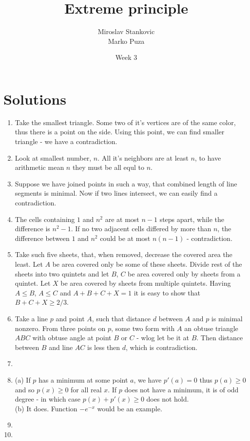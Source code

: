 \documentclass[12pt]{article}
\title{\textbf{Extreme principle}}
\date{Week 3}
\author{Miroslav Stankovic\\ Marko Puza}
\begin{document}
\maketitle

\section{Solutions}

\begin{enumerate}
	\item{Take the smallest triangle. Some two of it's vertices are of the same color, thus there is a point on the side. Using this point, we can find smaller triangle - we have a contradiction.
	}
	
	\item{Look at smallest number, $n$. All it's neighbors are at least $n$, to have arithmetic mean $n$ they must be all equl to $n$.}
	
	\item{Suppose we have joined points in such a way, that combined length of line segments is minimal. Now if two lines intersect, we can easily find a contradiction.}
	
	\item{The cells containing $1$ and $n^2$ are at most $n-1$ steps apart, while the difference is $n^2-1$. If no two adjacent cells differed by more than $n$, the difference between $1$ and $n^2$ could be at most $n(n-1)$ - contradiction.}
	
	\item{Take such five sheets, that, when removed, decrease the covered area the least. Let $A$ be area covered only be some of these sheets. Divide rest of the sheets into two quintets and let $B$, $C$ be area covered only by sheets from a quintet. Let $X$ be area covered by sheets from multiple quintets. Having $A\le B$, $A\le C$ and $A+B+C+X=1$ it is easy to show that $B+C+X \ge 2/3$.}
	
	\item{Take a line $p$ and point $A$, such that distance $d$ between $A$ and $p$ is minimal nonzero. From three points on $p$, some two form with $A$ an obtuse triangle $ABC$ with obtuse angle at point $B$ or $C$ - wlog let be it at $B$. Then distance between $B$ and line $AC$ is less then $d$, which is contradiction.}
	
	\item{}

	\item{(a) If $p$ has a minimum at some point $a$, we have $p'(a)=0$ thus $p(a)\ge 0$ and so $p(x)\ge 0 $ for all real $x$. If $p$ does not have a minimum, it is of odd degree - in which case $p(x) + p'(x) \ge 0$ does not hold.
\\(b) It does. Function $-e^{-x}$ would be an example.}
	
	\item{}
	
	\item{}


\end{enumerate}
\end{document}
